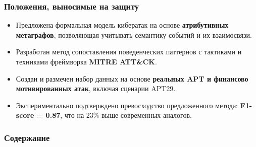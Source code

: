 
\begin{frame}
    \setcounter{framenumber}{1}
    \maketitle
\end{frame}

\begin{frame}
    \frametitle{Положения, выносимые на защиту}
    \begin{itemize}
        \item Предложена формальная модель кибератак на основе \textbf{атрибутивных метаграфов}, позволяющая учитывать семантику событий и их взаимосвязи.
        \item Разработан метод сопоставления поведенческих паттернов с тактиками и техниками фреймворка \textbf{MITRE ATT\&CK}.
        \item Создан и размечен набор данных на основе \textbf{реальных APT и финансово мотивированных атак}, включая сценарии APT29.
        \item Экспериментально подтверждено превосходство предложенного метода: \textbf{F1-score = 0.87}, что на 23\% выше современных аналогов.
    \end{itemize}
\end{frame}


\begin{frame}
    \frametitle{Содержание}
    \tableofcontents
\end{frame}


